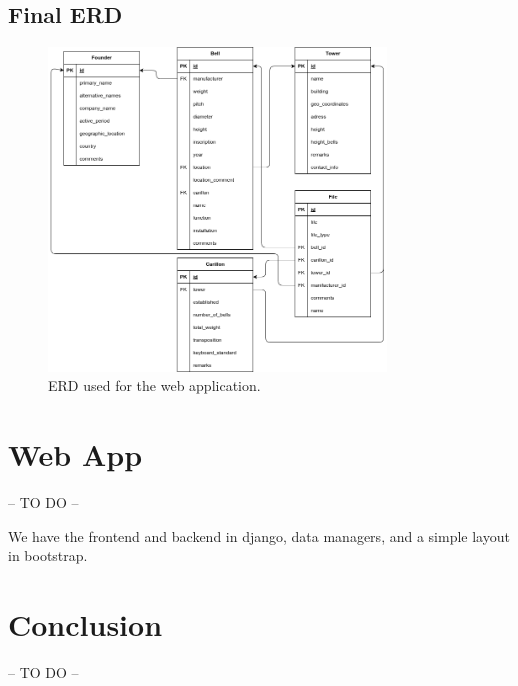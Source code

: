 \documentclass[11pt, a4paper]{article}
\begin{document}
\subsection{Final ERD}

\begin{figure}[h!]
    \centering
    \includegraphics[width=0.8\textwidth]{images/erd_inventaris_gent.png}
    \caption{ERD used for the web application.}
    \label{fig:erd-ghent}
\end{figure}

\section{Web App}

-- TO DO -- 

We have the frontend and backend in django, data managers, and a simple layout in bootstrap.

\section{Conclusion}

-- TO DO --
\end{document}
